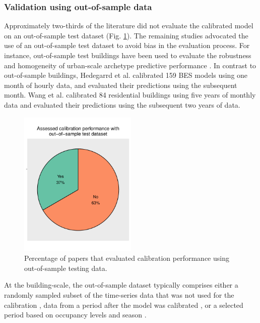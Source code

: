 \documentclass[review]{elsarticle}
\begin{document}
\subsubsection{Validation using out-of-sample data}

Approximately two-thirds of the literature did not evaluate the calibrated model on an out-of-sample test dataset (Fig. \ref{fig:test}). The remaining studies advocated the use of an out-of-sample test dataset to avoid bias in the evaluation process. For instance, out-of-sample test buildings have been used to evaluate the robustness and homogeneity of urban-scale archetype predictive performance \cite{kristensen2018hierarchical, sokol2017validation, kristensen2020long}. In contrast to out-of-sample buildings, Hedegarrd et al. \cite{hedegaard2019bottom} calibrated 159 BES models using one month of hourly data, and evaluated their predictions using the subsequent month. Wang et al. \cite{wang2020bayesian} calibrated 84 residential buildings using five years of monthly data and evaluated their predictions using the subsequent two years of data.

\begin{figure}[!h]
\centering
\includegraphics[width=0.5\textwidth]{figures/test_data.pdf}
\caption{Percentage of papers that evaluated calibration performance using out-of-sample testing data.}
\label{fig:test}
\end{figure}

At the building-scale, the out-of-sample dataset typically comprises either a randomly sampled subset of the time-series data that was not used for the calibration \cite{chong2017bayesian, chong2018guidelines}, data from a period after the model was calibrated \cite{yuan2017simultaneous, yin2016linking, li2016assessment, chen2019meta, manfren2020parametric, yang2015model}, or a selected period based on occupancy levels and season \cite{odonovan2019predicting}. 
\end{document}
